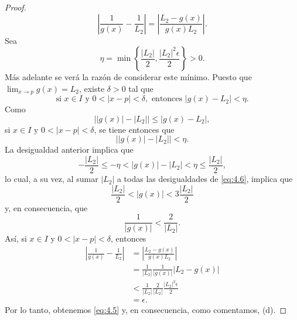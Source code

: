 \documentclass[12pt,a4paper]{book}
\begin{document}
\begin{proof}
\begin{equation*}
            \left|\frac{1}{g(x)}-\frac{1}{L_{2}}\right|=\left|\frac{L_{2}-g(x)}{g(x)L_{2}}\right|.
        \end{equation*}
        Sea
        \begin{equation*}
            \eta=\min\left\{\frac{|L_{2}|}{2},\frac{|L_{2}|^{2}\epsilon}{2}\right\}>0.
        \end{equation*}
        Más adelante se verá la razón de considerar este mínimo. Puesto que $\lim_{x\to p}g(x)=
        L_{2}$, existe $\delta>0$ tal que
        \begin{equation*}
            \text{si }x\in I\text{ y }0<|x-p|<\delta,\text{ entonces }|g(x)-L_{2}|<\eta.
        \end{equation*}
        Como
        \begin{equation*}
            \big||g(x)|-|L_{2}|\big|\leq|g(x)-L_{2}|,
        \end{equation*}
        si $x\in I$ y $0<|x-p|<\delta$, se tiene entonces que
        \begin{equation*}
            \big||g(x)|-|L_{2}|\big|<\eta.
        \end{equation*}
        La desigualdad anterior implica que
        \begin{equation}\label{eq:4.6}
            -\frac{|L_{2}|}{2}\leq-\eta<|g(x)|-|L_{2}|<\eta\leq\frac{|L_{2}|}{2},
        \end{equation}
        lo cual, a su vez, al sumar $|L_{2}|$ a todas las desigualdades de \eqref{eq:4.6}, implica que
        \begin{equation*}
            \frac{|L_{2}|}{2}<|g(x)|<3\frac{|L_{2}|}{2}
        \end{equation*}
        y, en consecuencia, que
        \begin{equation*}
            \frac{1}{|g(x)|}<\frac{2}{|L_{2}|}.
        \end{equation*}
        Así, si $x\in I$ y $0<|x-p|<\delta$, entonces
        \begin{align*}
            \left|\frac{1}{g(x)}-\frac{1}{L_{2}}\right|&=\left|\frac{L_{2}-g(x)}{g(x)L_{2}}\right|\\
            &=\frac{1}{|L_{2}|}\frac{1}{|g(x)|}|L_{2}-g(x)|\\
            &<\frac{1}{|L_{2}|}\frac{2}{|L_{2}|}\frac{|L_{2}|^{2}\epsilon}{2}\\
            &=\epsilon.
        \end{align*}
        Por lo tanto, obtenemos \eqref{eq:4.5} y, en consecuencia, como comentamos, (d).
    \end{proof}
\end{document}
